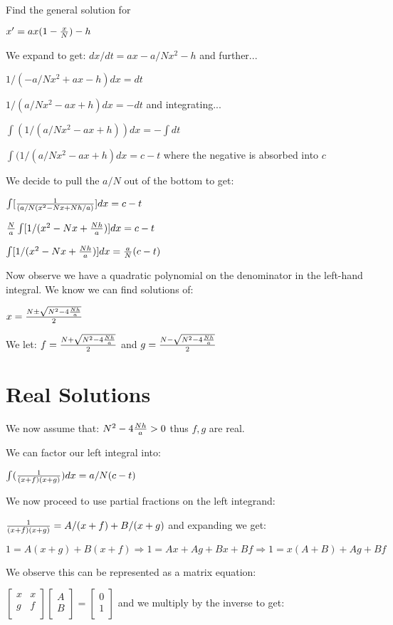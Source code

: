 \documentclass[12pt,letterpaper]{article}
\author{Vance Turnewitsch}
\begin{document}
Find the general solution for

$x'=ax(1-{x\over N}) -h$

We expand to get: $dx/dt = ax-a/Nx^2 -h$ and further...

$1/(-a/Nx^2+ax-h)dx = dt$ 

$1/(a/Nx^2-ax+h)dx= -dt$ and integrating...

$\int(1/(a/Nx^2-ax+h))dx =-\int dt$

$\int(1/(a/Nx^2-ax +h)dx = c-t$ where the negative is absorbed into $c$

We decide to pull the $a/N$ out of the bottom to get:

$\int[{1\over(a/N(x^2-Nx+Nh/a)}]dx=c-t$

${N\over a}\int[1/(x^2-Nx+{Nh\over a})]dx=c-t$

$\int[1/(x^2-Nx+{Nh\over a})]dx={a\over N}(c-t)$

Now observe we have a quadratic polynomial on the denominator in the left-hand integral. We know we can find solutions of:

$x={N\pm\sqrt{N^2-4{Nh\over a}}\over 2}$

We let: $f={N+\sqrt{N^2-4{Nh\over a}}\over 2}$ and $g={N-\sqrt{N^2-4{Nh\over a}}\over 2}$

\section{Real Solutions}
We now assume that: $N^2-4{Nh\over a}>0$ thus $f,g$ are real.

We can factor our left integral into:

$\int({1\over (x+f)(x+g)})dx=a/N(c-t)$

We now proceed to use partial fractions on the left integrand:

${1\over (x+f)(x+g)}=A/(x+f) + B/(x+g)$ and expanding we get:

$1 = A(x+g) + B(x+f) \Longrightarrow 1=Ax+Ag + Bx+Bf \Longrightarrow 1=x(A+B) + Ag + Bf$

We observe this can be represented as a matrix equation:

$\left[\begin{array}{ccc}
x & x \\
g & f \\
\end{array}\right]
\left[\begin{array}{c}
A\\
B\\\end{array}\right]=
\left[\begin{array}{c}
0 \\
1 \\
\end{array}\right]
$  and we multiply by the inverse to get:
\end{document}
